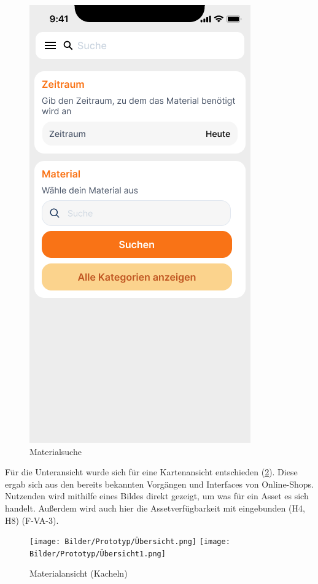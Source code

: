 \begin{figure}[h]
    \includegraphics[scale=0.3]{Bilder/Prototyp/Neu/Suche V2.png}
    \caption[Materialsuche]{Materialsuche}
    \label{fig:p1}
\end{figure}

Für die Unteransicht wurde sich für eine Kartenansicht entschieden
(\ref{fig:ubersicht}). Diese ergab sich aus den bereits bekannten Vorgängen und
Interfaces von Online-Shops. Nutzenden wird mithilfe eines Bildes direkt
gezeigt, um was für ein Asset es sich handelt. Außerdem wird auch hier die
Assetverfügbarkeit mit eingebunden (H4, H8) (F-VA-3).

\begin{figure}[h]
    \centering
    \texttt{[image: Bilder/Prototyp/Übersicht.png]}\hspace{2em}
    \texttt{[image: Bilder/Prototyp/Übersicht1.png]}
    \caption[Materialansicht (Kacheln)]{Materialansicht (Kacheln)}
    \label{fig:ubersicht}
\end{figure}

